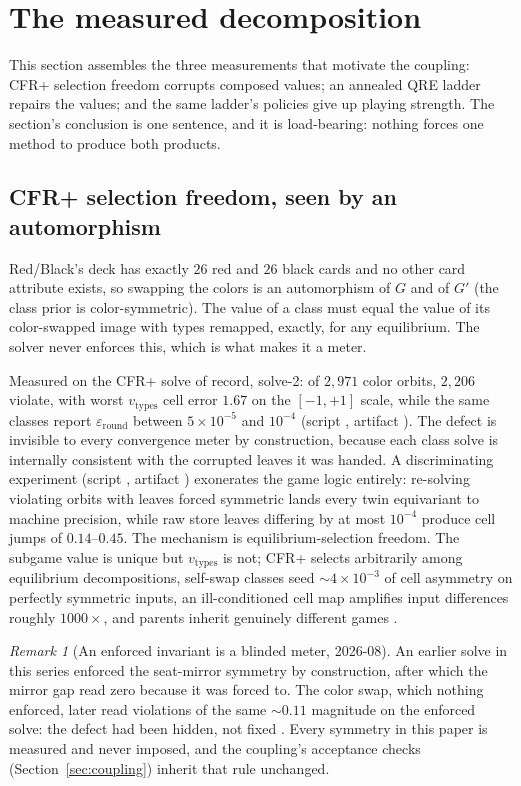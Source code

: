 \documentclass[11pt]{article}
\theoremstyle{plain}
\theoremstyle{definition}
\theoremstyle{remark}
\newtheorem{remark}[theorem]{Remark}
\newcommand{\game}{\ensuremath{G}}
\newcommand{\gp}{\ensuremath{G'}}
\newcommand{\epsround}{\ensuremath{\varepsilon_{\mathrm{round}}}}
\newcommand{\vtypes}{\ensuremath{v_{\mathrm{types}}}}
\begin{document}
\section{The measured decomposition}\label{sec:decomposition}

This section assembles the three measurements that motivate the
coupling: CFR+ selection freedom corrupts composed values; an annealed
QRE ladder repairs the values; and the same ladder's policies give up
playing strength. The section's conclusion is one sentence, and it is
load-bearing: nothing forces one method to produce both products.

\subsection{CFR+ selection freedom, seen by an automorphism}
\label{sec:cfrfree}

Red/Black's deck has exactly $26$ red and $26$ black cards and no other
card attribute exists, so swapping the colors is an automorphism of
$\game$ and of $\gp$ (the class prior is color-symmetric). The value of
a class must equal the value of its color-swapped image with types
remapped, exactly, for any equilibrium. The solver never enforces this,
which is what makes it a meter.

Measured on the CFR+ solve of record, solve-2: of $2{,}971$ color
orbits, $2{,}206$ violate, with worst $\vtypes$ cell error $1.67$ on
the $[-1,+1]$ scale, while the same classes report $\epsround$ between
$5\times10^{-5}$ and $10^{-4}$ (script ,
artifact ). The defect is invisible to every
convergence meter by construction, because each class solve is
internally consistent with the corrupted leaves it was handed. A
discriminating experiment (script ,
artifact ) exonerates the game logic
entirely: re-solving violating orbits with leaves forced symmetric
lands every twin equivariant to machine precision, while raw store
leaves differing by at most $10^{-4}$ produce cell jumps of
$0.14$--$0.45$. The mechanism is equilibrium-selection freedom. The
subgame value is unique but $\vtypes$ is not; CFR+ selects arbitrarily
among equilibrium decompositions, self-swap classes seed
$\sim4\times10^{-3}$ of cell asymmetry on perfectly symmetric inputs,
an ill-conditioned cell map amplifies input differences roughly
$1000\times$, and parents inherit genuinely different games \cite{rb2}.

\begin{remark}[An enforced invariant is a blinded meter, 2026-08]
\label{rem:enforce}
An earlier solve in this series enforced the seat-mirror symmetry by
construction, after which the mirror gap read zero because it was forced
to. The color swap, which nothing enforced, later read violations of
the same $\sim0.11$ magnitude on the enforced solve: the defect had been
hidden, not fixed \cite{rb2}. Every symmetry in this paper is measured
and never imposed, and the coupling's acceptance checks
(Section~\ref{sec:coupling}) inherit that rule unchanged.
\end{remark}
\end{document}
